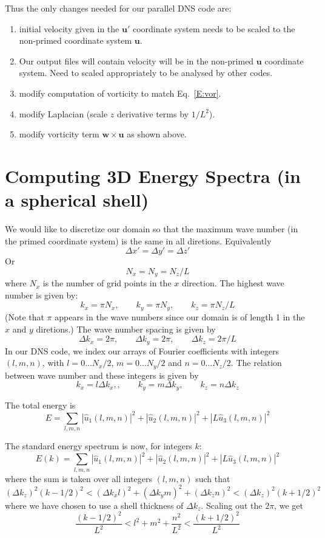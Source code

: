 \documentclass[12pt]{article}
\newcommand{\uv}{\mathbf u}
\newcommand{\up}{\mathbf u'}
\newcommand{\w}{\mathbf w}
\begin{document}
\newpage
Thus the only changes needed for our parallel DNS code are:
\begin{enumerate}
\item initial velocity given in the $\up$ coordinate system 
needs to be scaled to the non-primed coordinate system $\uv$.
\item Our output files will contain velocity will be in the non-primed 
$\uv$ coordinate system.  Need to scaled appropriately  to be analysed
by other codes.
\item modify computation of vorticity to match Eq.~\ref{E:vor}.
\item modify Laplacian (scale $z$ derivative terms by $1/L^2$).
\item modify vorticity term $\w \times \uv$ as shown above.
\end{enumerate}



\section{Computing 3D Energy Spectra (in a spherical shell)}
We would like to discretize our domain so that the 
maximum wave number (in the primed coordinate system) is
the same in all diretions.  Equivalently
\[
\Delta x' = \Delta y' = \Delta z'
\]
Or
\[
N_x  = N_y = N_z/L
\]
where $N_x$ is the number of grid points in the $x$ direction.
The highest wave number is given by:
\[
k_x = \pi N_x, \qquad k_y = \pi N_y, \qquad k_z = \pi N_z/L 
\]
(Note that $\pi$ appears in the wave numbers since our domain is
of length 1 in the $x$ and $y$ diretions.)  The wave number spacing
is given by
\[
\Delta k_x = 2 \pi, \qquad  \Delta k_y = 2 \pi, \qquad  \Delta k_z = 2 \pi / L 
\]
In our DNS code, we index our arrays of Fourier coefficients
with integers $(l,m,n)$, with $l=0 \dots N_x/2$, 
$m=0 \dots N_y/2$ and 
$n=0 \dots N_z/2$.
The relation between wave number and
these integers is 
given by
\[
k_x = l \Delta k_x,, \qquad  k_y = m \Delta k_y, \qquad  k_z = n  \Delta k_z
\]


The total energy is
\[
E  = \sum_{l,m,n}  |  {\hat u_1}(l,m,n) |^2 +
 |  {\hat u_2}(l,m,n) |^2 + 
 |  L {\hat u_3}(l,m,n) |^2
\]

The standard energy spectrum is now, for integers $k$:
\[
E(k)  = \sum_{l,m,n}  |  {\hat u_1}(l,m,n) |^2 +
 |  {\hat u_2}(l,m,n) |^2 + 
 |  L {\hat u_3}(l,m,n) |^2
\]
where the sum is taken over all integers $(l,m,n)$ such that
\[
(\Delta k_z)^2 (k-1/2)^2 < (\Delta k_x l)^2 + (\Delta k_y m)^2 + (\Delta k_z n)^2 <  (\Delta k_z)^2 (k+1/2)^2 
\]
where we have chosen to use a shell thickness of $\Delta k_z$.
 Scaling out the $2\pi$, we get
\[
\frac{(k-1/2)^2}{L^2} < l^2 + m^2 + \frac{n^2}{L^2} < \frac{(k+1/2)^2}{L^2}
\]  
\end{document}
